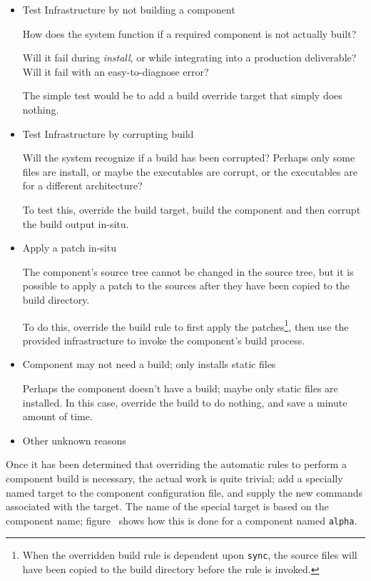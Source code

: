 \begin{itemize}
\item Test \bni Infrastructure by not building a component

  How does the \bni system function if a required component is not
  actually built?

  Will it fail during \emph{install}, or while integrating into a
  production deliverable?  Will it fail with an easy-to-diagnose
  error?

  The simple test would be to add a build override target that simply
  does nothing.

\item Test \bni Infrastructure by corrupting build

  Will the \bni system recognize if a build has been corrupted?
  Perhaps only some files are install, or maybe the executables are
  corrupt, or the executables are for a different architecture?

  To test this, override the build target, build the component and
  then corrupt the build output in-situ.

\item Apply a patch in-situ

  The component's source tree cannot be changed in the source tree,
  but it is possible to apply a patch to the sources after they have
  been copied to the build directory.

  To do this, override the build rule to first apply the
  patches\footnote{When the overridden build rule is dependent upon
    \texttt{sync}, the source files will have been copied to the build
    directory before the rule is invoked.}, then use the provided
  \lmsbw infrastructure to invoke the component's build process.

\item Component may not need a build; only installs static files

  Perhaps the component doesn't have a build; maybe only static files
  are installed.  In this case, override the build to do nothing, and
  save a minute amount of time.

\item Other unknown reasons
\end{itemize}

Once it has been determined that overriding the automatic rules to
perform a component build is necessary, the actual work is quite
trivial; add a specially named \makefile target to the component
configuration file, and supply the new commands associated with the
target.  The name of the special target is based on the component
name; figure~ shows how this
is done for a component named \texttt{alpha}.

